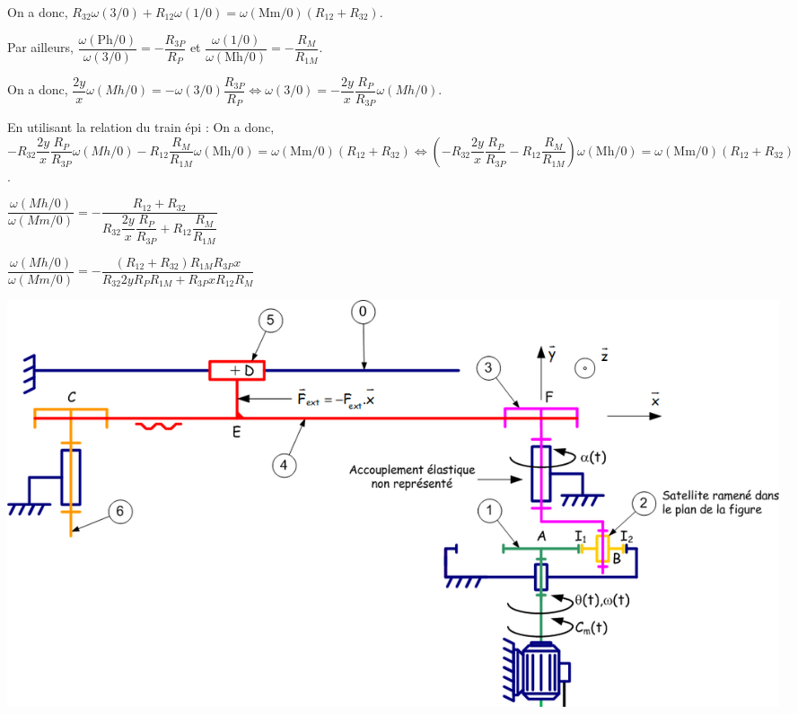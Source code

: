 \documentclass[10pt,fleqn]{article} %
\begin{document}
\begin{multicols}{2}
\begin{corrige}
On a donc, $R_{32} \omega(3/0) +R_{12}\omega(1/0) = \omega(\text{Mm}/0)\left(R_{12}+R_{32}\right)$.

Par ailleurs, $\dfrac{\omega(\text{Ph}/0)}{\omega(3/0)} = -\dfrac{R_{3P}}{R_P}$ et 
$\dfrac{\omega(1/0)}{\omega(\text{Mh}/0)} = -\dfrac{R_M}{R_{1M}}$.

On a donc, $ \dfrac{2y}{x} \omega(Mh/0)= -\omega(3/0)\dfrac{R_{3P}}{R_P} \Leftrightarrow  \omega(3/0) = -\dfrac{2y}{x} \dfrac{R_P}{R_{3P}}\omega(Mh/0)$.

En utilisant la relation du train épi :
On a donc, $-R_{32} \dfrac{2y}{x} \dfrac{R_P}{R_{3P}}\omega(Mh/0)  -R_{12} \dfrac{R_M}{R_{1M}} \omega(\text{Mh}/0) = \omega(\text{Mm}/0)\left(R_{12}+R_{32}\right) \Leftrightarrow \left(-R_{32} \dfrac{2y}{x} \dfrac{R_P}{R_{3P}}  -R_{12} \dfrac{R_M}{R_{1M}} \right)\omega(\text{Mh}/0) = \omega(\text{Mm}/0)\left(R_{12}+R_{32}\right)$.


$\dfrac{\omega(Mh/0)}{\omega(Mm/0)}=-\dfrac{R_{12}+R_{32}}{R_{32} \dfrac{2y}{x} \dfrac{R_P}{R_{3P}}  +R_{12} \dfrac{R_M}{R_{1M}}}$

$\dfrac{\omega(Mh/0)}{\omega(Mm/0)}=-\dfrac{\left( R_{12}+R_{32}\right)R_{1M} R_{3P}x }{R_{32} 2y R_PR_{1M} + R_{3P}xR_{12} R_M}$
\end{corrige}
\else
\fi

\end{multicols}

 
\begin{center}
\includegraphics[width=\linewidth]{images/fig_02}
\end{center}
\end{document}
